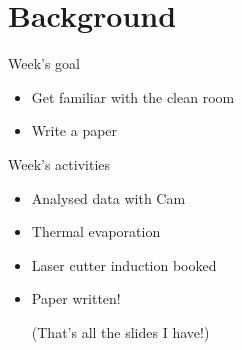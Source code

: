 \documentclass[presentation]{beamer}
\author{Mark Blyth}
\date{}
\title{}
\begin{document}
\section{Background}
\label{sec:org13d8ead}
\begin{frame}[label={sec:org6718245}]{Week's goal}
\begin{itemize}
\item Get familiar with the clean room
\item Write a paper
\end{itemize}
\end{frame}
\begin{frame}[label={sec:org63507bf}]{Week's activities}
\begin{itemize}
\item Analysed data with Cam
\item Thermal evaporation
\item Laser cutter induction booked
\item Paper written!

\vfill

(That's all the slides I have!)
\end{itemize}
\end{frame}
\end{document}
